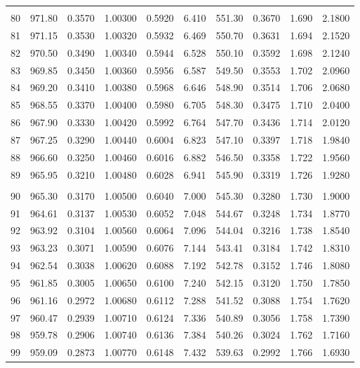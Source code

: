 \documentclass[letter,twosides,10pt]{article}
\begin{document}
\begin{longtable}{|c|c|c|c|c|c|c|c|c|c|}
 & & & & & & & & & \\ 
 80 & 971.80 & 0.3570 & 1.00300 & 0.5920 &  6.410 & 551.30 & 0.3670 & 1.690 &  2.1800 \\
 81 & 971.15 & 0.3530 & 1.00320 & 0.5932 &  6.469 & 550.70 & 0.3631 & 1.694 &  2.1520 \\
 82 & 970.50 & 0.3490 & 1.00340 & 0.5944 &  6.528 & 550.10 & 0.3592 & 1.698 &  2.1240 \\
 83 & 969.85 & 0.3450 & 1.00360 & 0.5956 &  6.587 & 549.50 & 0.3553 & 1.702 &  2.0960 \\
 84 & 969.20 & 0.3410 & 1.00380 & 0.5968 &  6.646 & 548.90 & 0.3514 & 1.706 &  2.0680 \\
 85 & 968.55 & 0.3370 & 1.00400 & 0.5980 &  6.705 & 548.30 & 0.3475 & 1.710 &  2.0400 \\
 86 & 967.90 & 0.3330 & 1.00420 & 0.5992 &  6.764 & 547.70 & 0.3436 & 1.714 &  2.0120 \\
 87 & 967.25 & 0.3290 & 1.00440 & 0.6004 &  6.823 & 547.10 & 0.3397 & 1.718 &  1.9840 \\
 88 & 966.60 & 0.3250 & 1.00460 & 0.6016 &  6.882 & 546.50 & 0.3358 & 1.722 &  1.9560 \\
 89 & 965.95 & 0.3210 & 1.00480 & 0.6028 &  6.941 & 545.90 & 0.3319 & 1.726 &  1.9280 \\
 & & & & & & & & & \\ 
 90 & 965.30 & 0.3170 & 1.00500 & 0.6040 &  7.000 & 545.30 & 0.3280 & 1.730 &  1.9000 \\
 91 & 964.61 & 0.3137 & 1.00530 & 0.6052 &  7.048 & 544.67 & 0.3248 & 1.734 &  1.8770 \\
 92 & 963.92 & 0.3104 & 1.00560 & 0.6064 &  7.096 & 544.04 & 0.3216 & 1.738 &  1.8540 \\
 93 & 963.23 & 0.3071 & 1.00590 & 0.6076 &  7.144 & 543.41 & 0.3184 & 1.742 &  1.8310 \\
 94 & 962.54 & 0.3038 & 1.00620 & 0.6088 &  7.192 & 542.78 & 0.3152 & 1.746 &  1.8080 \\
 95 & 961.85 & 0.3005 & 1.00650 & 0.6100 &  7.240 & 542.15 & 0.3120 & 1.750 &  1.7850 \\
 96 & 961.16 & 0.2972 & 1.00680 & 0.6112 &  7.288 & 541.52 & 0.3088 & 1.754 &  1.7620 \\
 97 & 960.47 & 0.2939 & 1.00710 & 0.6124 &  7.336 & 540.89 & 0.3056 & 1.758 &  1.7390 \\
 98 & 959.78 & 0.2906 & 1.00740 & 0.6136 &  7.384 & 540.26 & 0.3024 & 1.762 &  1.7160 \\
 99 & 959.09 & 0.2873 & 1.00770 & 0.6148 &  7.432 & 539.63 & 0.2992 & 1.766 &  1.6930 \\

\end{longtable}
\end{document}

